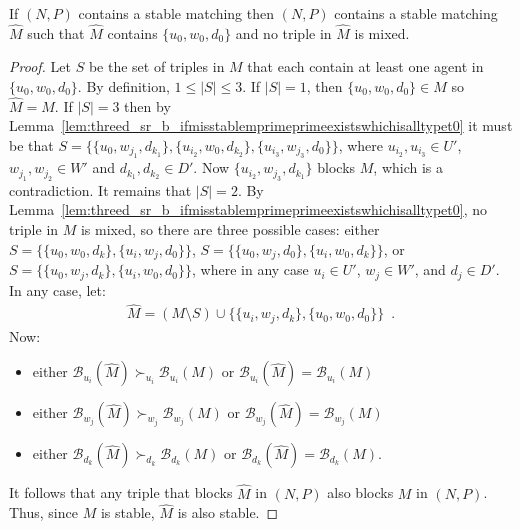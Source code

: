 \begin{lem}
\label{lem:threed_sr_b_misstableexistsmprimeprimeprime}
If $(N, P)$ contains a stable matching then $(N, P)$ contains a stable matching $\hat{M}$ such that $\hat{M}$ contains $\{ u_0, w_0, d_0 \}$ and no triple in $\hat{M}$ is mixed.
\end{lem}
\begin{proof}
Let $S$ be the set of triples in $M$ that each contain at least one agent in $\{ u_0, w_0, d_0 \}$. By definition, $1 \leq |S| \leq 3$. If $|S| = 1$, then $\{ u_0, w_0, d_0 \} \in M$ so $\hat{M} = M$. If $|S| = 3$ then by Lemma~\ref{lem:threed_sr_b_ifmisstablemprimeprimeexistswhichisalltypet0} it must be that $S = \{ \{ u_0, w_{j_1}, d_{k_1} \}, \{ u_{i_2}, w_0, d_{k_2} \}, \{ u_{i_3}, w_{j_3}, d_0 \} \}$, where $u_{i_2}, u_{i_3} \in U'$, $w_{j_1}, w_{j_2} \in W'$ and $d_{k_1}, d_{k_2} \in D'$. Now $\{ u_{i_2}, w_{j_3}, d_{k_1}\}$ blocks $M$, which is a contradiction. It remains that $|S| = 2$. By Lemma~\ref{lem:threed_sr_b_ifmisstablemprimeprimeexistswhichisalltypet0}, no triple in $M$ is mixed, so there are three possible cases: either $S = \{ \{ u_0, w_0, d_k \}, \{ u_i, w_j, d_0 \} \}$, $S = \{ \{ u_0, w_j, d_0\}, \{ u_i, w_0, d_k\} \}$, or $S = \{ \{ u_0, w_j, d_k\}, \{ u_i, w_0, d_0\} \}$, where in any case $u_i \in U'$, $w_j\in W'$, and $d_j\in D'$. In any case, let:
\begin{align*}
    \hat{M} = (M \setminus S) \cup \{ \{ u_i, w_j, d_k \}, \{ u_0, w_0, d_0 \} \}\enspace.
\end{align*}
Now:
\begin{itemize}
    \item either $\mathscr{B}_{u_i}(\hat{M}) \succ_{u_i} \mathscr{B}_{u_i}(M)$ or $\mathscr{B}_{u_i}(\hat{M}) = \mathscr{B}_{u_i}(M)$
    \item either $\mathscr{B}_{w_j}(\hat{M}) \succ_{w_j} \mathscr{B}_{w_j}(M)$ or $\mathscr{B}_{w_j}(\hat{M}) = \mathscr{B}_{w_j}(M)$
    \item either $\mathscr{B}_{d_k}(\hat{M}) \succ_{d_k} \mathscr{B}_{d_k}(M)$ or $\mathscr{B}_{d_k}(\hat{M}) = \mathscr{B}_{d_k}(M)$.
\end{itemize}
It follows that any triple that blocks $\hat{M}$ in $(N, P)$ also blocks $M$ in $(N, P)$. Thus, since $M$ is stable, $\hat{M}$ is also stable.
\end{proof}

